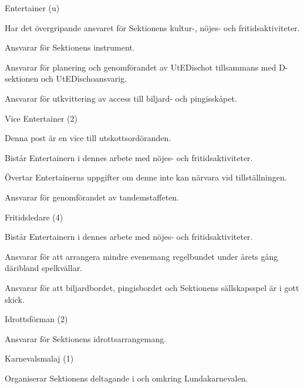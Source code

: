 \documentclass[10pt]{article}
\begin{document}
\begin{emptylist}
    \item Entertainer (u)
        \begin{dashlist}
          \item Har det övergripande ansvaret för Sektionens kultur-, nöjes- och fritidsaktiviteter.
          \item Ansvarar för Sektionens instrument.
          \item Ansvarar för planering och genomförandet av UtEDischot tillsammans med D-sektionen och UtEDischoansvarig.
          \item Ansvarar för utkvittering av access till biljard- och pingisskåpet.
        \end{dashlist}
    \item Vice Entertainer (2)
        \begin{dashlist}
            \item Denna post är en vice till utskottsordöranden.
          \item Bistår Entertainern i dennes arbete med nöjes- och fritidsaktiviteter.
          \item Övertar Entertainerns uppgifter om denne inte kan närvara vid tillställningen.
          \item Ansvarar för genomförandet av tandemstaffeten.
        \end{dashlist}
    \item Fritidsledare (4)
        \begin{dashlist}
            \item Bistår Entertainern i dennes arbete med nöjes- och fritidsaktiviteter.
            \item Ansvarar för att arrangera mindre evenemang regelbundet under årets gång däribland spelkvällar.
            \item Ansvarar för att biljardbordet, pingisbordet och Sektionens sällskapsspel är i gott skick.
        \end{dashlist}
    \item Idrottsförman (2)
        \begin{dashlist}
            \item Ansvarar för Sektionens idrottsarrangemang.
        \end{dashlist}
    \item Karnevalsmalaj (1)
        \begin{dashlist}
            \item Organiserar Sektionens deltagande i och omkring Lundakarnevalen.

\end{dashlist}
\end{emptylist}
\end{document}
